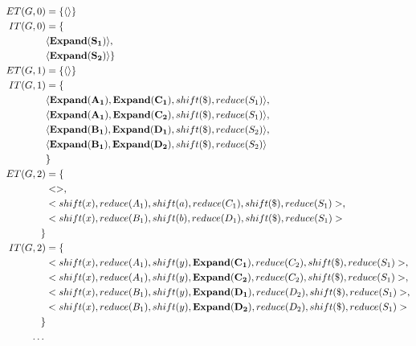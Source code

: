 \documentclass[envcountsame,runningheads]{llncs}
\begin{document}
{\small\begin{align*}
ET(G, 0) & = \{ \langle \rangle \}\\
IT(G, 0) & = \{\\
\quad & \langle \mathbf{Expand(S_1)} \rangle,\\
\quad & \langle \mathbf{Expand(S_2)} \rangle \}\\
ET(G, 1) & = \{ \langle \rangle \}\\
IT(G, 1) & = \{ \\
\quad & \langle \mathbf{Expand(A_1)}, \mathbf{Expand(C_1)}, shift(\$), reduce(S_1) \rangle,\\
\quad & \langle \mathbf{Expand(A_1)}, \mathbf{Expand(C_2)}, shift(\$), reduce(S_1) \rangle,\\
\quad & \langle \mathbf{Expand(B_1)}, \mathbf{Expand(D_1)}, shift(\$), reduce(S_2) \rangle, \\
\quad & \langle \mathbf{Expand(B_1)}, \mathbf{Expand(D_2)}, shift(\$), reduce(S_2) \rangle \\
\quad & \}\\
ET(G, 2) & = \{\\
\quad & <>, \\
\quad & <shift(x), reduce(A_1), shift(a), reduce(C_1), shift(\$), reduce(S_1)>,\\
\quad & <shift(x), reduce(B_1), shift(b), reduce(D_1), shift(\$), reduce(S_1)>\\
\}\\
IT(G, 2) & = \{ \\
\quad & <shift(x), reduce(A_1), shift(y), \mathbf{Expand(C_1)}, reduce(C_2), shift(\$), reduce(S_1)>,\\
\quad & <shift(x), reduce(A_1), shift(y), \mathbf{Expand(C_2)}, reduce(C_2), shift(\$), reduce(S_1)>,\\
\quad & <shift(x), reduce(B_1), shift(y), \mathbf{Expand(D_1)}, reduce(D_2), shift(\$), reduce(S_1)>,\\
\quad & <shift(x), reduce(B_1), shift(y), \mathbf{Expand(D_2)}, reduce(D_2), shift(\$), reduce(S_1)>\\
 \}\\
 \textellipsis
\end{align*}}


\end{document}
